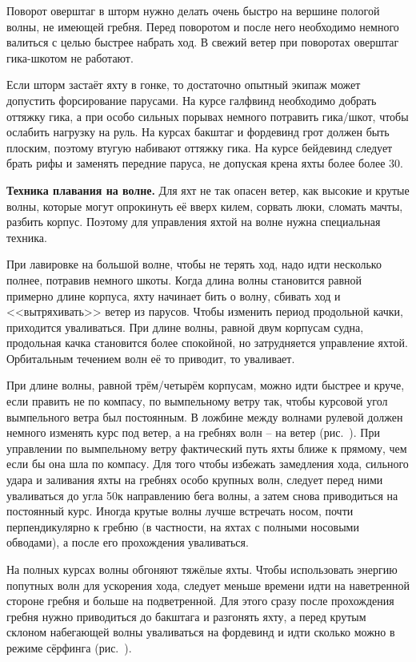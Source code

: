 Поворот оверштаг в шторм нужно делать очень быстро на вершине пологой
волны, не имеющей гребня. Перед поворотом и после него необходимо
немного валиться с целью быстрее набрать ход. В свежий ветер при
поворотах оверштаг гика-шкотом не работают.

Если шторм застаёт яхту в гонке, то достаточно опытный экипаж может
допустить форсирование парусами. На курсе галфвинд необходимо добрать
оттяжку гика, а при особо сильных порывах немного потравить
гика\-/шкот, чтобы ослабить нагрузку на руль. На курсах бакштаг и
фордевинд грот должен быть плоским, поэтому втугую набивают оттяжку
гика. На курсе бейдевинд следует брать рифы и заменять передние
паруса, не допуская крена яхты более более 30\gr.
 
\textbf{Техника плавания на волне.} Для яхт не так опасен ветер, как
высокие и крутые волны, которые могут опрокинуть её вверх килем,
сорвать люки, сломать мачты, разбить корпус. Поэтому для управления
яхтой на волне нужна специальная техника.

При лавировке на большой волне, чтобы не терять ход, надо идти
несколько полнее, потравив немного шкоты. Когда длина волны становится
равной примерно длине корпуса, яхту начинает бить о волну, сбивать ход
и <<вытряхивать>> ветер из парусов. Чтобы изменить период продольной
качки, приходится уваливаться. При длине волны, равной двум корпусам
судна, продольная качка становится более спокойной, но затрудняется
управление яхтой. Орбитальным течением волн её то приводит, то
уваливает.

При длине волны, равной трём\-/четырём корпусам, можно идти быстрее и
круче, если править не по компасу, по вымпельному ветру так, чтобы
курсовой угол вымпельного ветра был постоянным. В ложбине между
волнами рулевой должен немного изменять курс под ветер, а на гребнях
волн \--- на ветер (рис.~). При управлении по вымпельному
ветру фактический путь яхты ближе к прямому, чем если бы она шла по
компасу. Для того чтобы избежать замедления хода, сильного удара и
заливания яхты на гребнях особо крупных волн, следует перед ними
уваливаться до угла 50\gr к направлению бега волны, а затем
снова приводиться на постоянный курс. Иногда крутые волны лучше
встречать носом, почти перпендикулярно к гребню (в частности, на яхтах
с полными носовыми обводами), а после его прохождения уваливаться.

На полных курсах волны обгоняют тяжёлые яхты. Чтобы использовать
энергию попутных волн для ускорения хода, следует меньше времени идти
на наветренной стороне гребня и больше на подветренной. Для этого
сразу после прохождения гребня нужно приводиться до бакштага и
разгонять яхту, а перед крутым склоном набегающей волны уваливаться на
фордевинд и идти сколько можно в режиме сёрфинга (рис.~).

